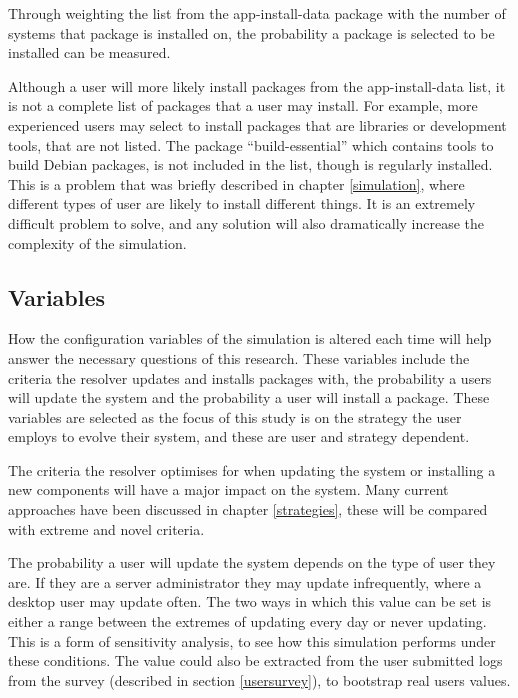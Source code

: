 Through weighting the list from the app-install-data package with the number of systems that package is installed on,
the probability a package is selected to be installed can be measured.

Although a user will more likely install packages from the app-install-data list, it is not a complete list of packages that a user may install. 
For example, more experienced users may select to install packages that are libraries or development tools, that are not listed.
The package ``build-essential'' which contains tools to build Debian packages, is not included in the list, though is regularly installed.
This is a problem that was briefly described in chapter \ref{simulation}, where different types of user are likely to install different things.
It is an extremely difficult problem to solve, and any solution will also dramatically increase the complexity of the simulation.

\subsection{Variables}
How the configuration variables of the simulation is altered each time will help answer the necessary questions of this research.
These variables include the criteria the resolver updates and installs packages with,
the probability a users will update the system and the probability a user will install a package.
These variables are selected as the focus of this study is on the strategy the user employs to evolve their system,
and these are user and strategy dependent.

The criteria the resolver optimises for when updating the system or installing a new components will have a major impact on the system.
Many current approaches have been discussed in chapter \ref{strategies}, these will be compared with extreme and novel criteria.

The probability a user will update the system depends on the type of user they are.
If they are a server administrator they may update infrequently, where a desktop user may update often.
The two ways in which this value can be set is either a range between the extremes of updating every day or never updating.
This is a form of sensitivity analysis, to see how this simulation performs under these conditions.
The value could also be extracted from the user submitted logs from the survey (described in section \ref{usersurvey}), to bootstrap real users values.

